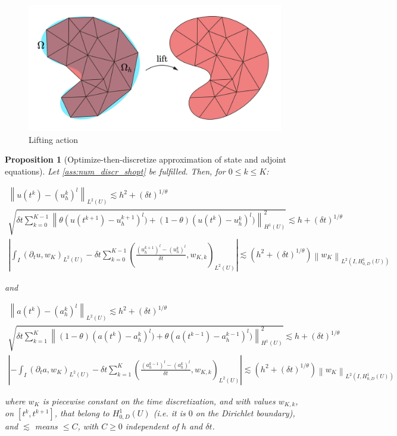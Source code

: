 \documentclass[english,a4paper,9pt,oneside]{scrbook}	%
\theoremstyle{break}
\newtheorem{prop}[equation]{Proposition}
\theoremstyle{remark}
\newcommand{\norm}[1]{\left\lVert#1\right\rVert}
\begin{document}
\begin{figure}[H]
\centering
\includegraphics[width=0.5\columnwidth]{Images/Lift.pdf}
\caption{Lifting action}\label{fig:lift}
\end{figure}


\begin{prop}[Optimize-then-discretize approximation of state and adjoint equations]
\label{prop:o-t-d}
Let \cref{ass:num_discr_shopt} be fulfilled. Then, for $0\leq k \leq K$:

\begin{align*}
	\norm{u(t^k)-(u_h^k)^l}_{L^2(U)}\lesssim  h^2 + (\delta t)^{1/\theta}\\
	\sqrt{\delta t \sum_{k=0}^{K-1} \norm{\theta(u(t^{k+1}) - u_h^{k+1})^l) + (1-\theta)(u(t^{k}) - u_h^{k})^l)}_{H^1(U)}^2} \lesssim h + (\delta t)^{1/\theta}\\
	\left | \int_I (\partial_t u , w_K)_{L^2(U)}-\delta t \sum_{k=0}^{K-1}\left ( \frac{(u^{k+1}_h)^l - (u_h^k)^l}{\delta t} , w_{K,k}\right )_{L^2(U)} \right |\lesssim \left ( h^2 + (\delta t)^{1/\theta} \right ) \norm{w_K}_{L^2(I,H^1_{0,D}(U))}
\end{align*}

and

\begin{align*}
	\norm{a(t^k)-(a_h^k)^l}_{L^2(U)}\lesssim  h^2 + (\delta t)^{1/\theta}\\
	\sqrt{\delta t \sum_{k=1}^{K} \norm{(1-\theta)(a(t^{k}) - a_h^{k})^l) + \theta(a(t^{k-1}) - a_h^{k-1})^l)}_{H^1(U)}^2} \lesssim h + (\delta t)^{1/\theta}\\
	\left |- \int_I (\partial_t a , w_K)_{L^2(U)}-\delta t \sum_{k=1}^{K}\left ( \frac{(a^{k-1}_h)^l - (a_h^{k})^l}{\delta t} , w_{K,k}\right )_{L^2(U)} \right |\lesssim \left ( h^2 + (\delta t)^{1/\theta} \right ) \norm{w_K}_{L^2(I,H^1_{0,D}(U))}
\end{align*}

where $w_K$ is piecewise constant on the time discretization, and with values $w_{K,k}$, on $[t^k,t^{k+1}]$, that belong to $H^1_{0,D}(U)$ (i.e. it is $0$ on the Dirichlet boundary), and $\lesssim$ means $\leq C$, with $C\geq 0$ independent of $h$ and $\delta t$.

\end{prop}
\end{document}
